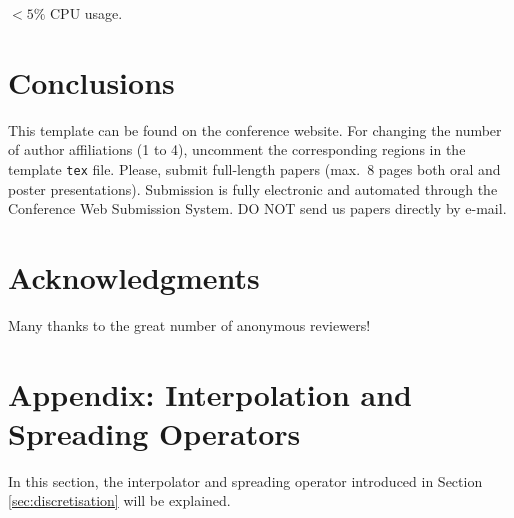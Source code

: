 \documentclass[twoside,a4paper]{article}
\begin{document}
$<5\%$ CPU usage. 
\section{Conclusions}\label{sec:conclusion}
This template can be found on the conference website.
For changing the number of author affiliations (1 to 4), uncomment the corresponding regions in the template \texttt{tex} file.
Please, submit full-length papers (max.~8 pages both oral and poster presentations).
Submission is fully electronic and automated through the Conference Web Submission System.
DO NOT send us papers directly by e-mail.

\section{Acknowledgments}
Many thanks to the great number of anonymous reviewers!

\nocite{*}


\section{Appendix: Interpolation and Spreading Operators}
\label{app:interpol}
In this section, the interpolator and spreading operator introduced in Section \ref{sec:discretisation} will be explained.
\end{document}
